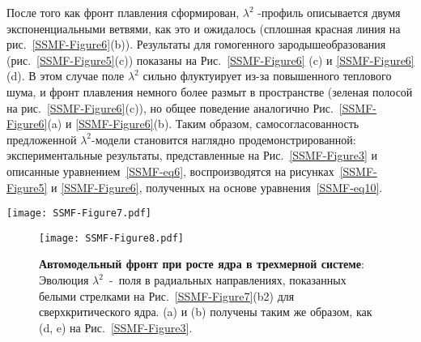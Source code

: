 После того как фронт плавления сформирован, $\lambda^2$ -профиль описывается двумя экспоненциальными ветвями, как это и ожидалось (сплошная красная линия на рис.~\ref{SSMF-Figure6}(b)).
Результаты для гомогенного зародышеобразования (рис.~\ref{SSMF-Figure5}(c)) показаны на Рис.~\ref{SSMF-Figure6} (c) и \ref{SSMF-Figure6}(d).
В этом случае поле $\lambda^2$ сильно флуктуирует из-за повышенного теплового шума, и фронт плавления немного более размыт в пространстве (зеленая полосой на рис.~\ref{SSMF-Figure6}(c)), но общее поведение аналогично Рис.~\ref{SSMF-Figure6}(a) и \ref{SSMF-Figure6}(b).
Таким образом, самосогласованность предложенной $\lambda^2$-модели становится наглядно продемонстрированной: экспериментальные результаты, представленные на Рис.~\ref{SSMF-Figure3} и описанные уравнением~\eqref{SSMF-eq6}, воспроизводятся на рисунках~\ref{SSMF-Figure5} и \ref{SSMF-Figure6}, полученных на основе уравнения~\eqref {SSMF-eq10}.

\begin{figure*}[!t]
\centering
\texttt{[image: SSMF-Figure7.pdf]}
 \caption{\textbf{Эволюция различных начальных трехмерных (сферических) $\lambda^2$~-~флуктуаций (ядер) и спонтанное зарождение в однородной системе}:
Последовательные кадры иллюстрируют эволюцию (a) докритической и (b) сверхкритической $\lambda^2$ -флуктуации (ядра) и спонтанное зарождение ядра из-за теплового шума.}
\label{SSMF-Figure7}
\end{figure*}

\begin{figure}[!t]
\centering
\texttt{[image: SSMF-Figure8.pdf]}
 \caption{\textbf{Автомодельный фронт при росте ядра в трехмерной системе}:
Эволюция $\lambda^2$~-~поля в радиальных направлениях, показанных белыми стрелками на Рис.~\ref{SSMF-Figure7}(b2) для сверхкритического ядра.
(a) и (b) получены таким же образом, как (d, e) на Рис.~\ref{SSMF-Figure3}.}
\label{SSMF-Figure8}
\end{figure}

